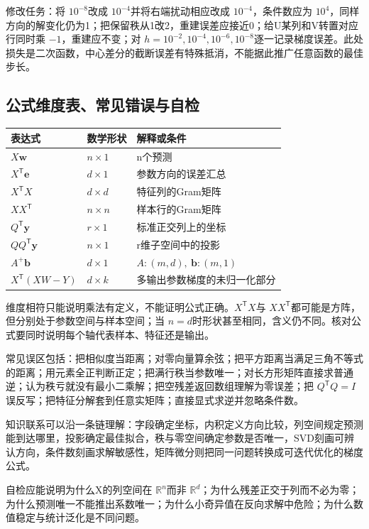 \documentclass[UTF8,fontset=none,zihao=-4,a4paper]{ctexart}
\numberwithin{equation}{section}
\numberwithin{figure}{section}
\begin{document}
修改任务：将 $10^{-8}$改成 $10^{-4}$并将右端扰动相应改成 $10^{-4}$，条件数应为 $10^4$，同样方向的解变化仍为1；把保留秩从1改2，重建误差应接近0；给U某列和V转置对应行同时乘 $-1$，重建应不变；对 $h=10^{-2},10^{-4},10^{-6},10^{-8}$逐一记录梯度误差。此处损失是二次函数，中心差分的截断误差有特殊抵消，不能据此推广任意函数的最佳步长。

\subsection{公式维度表、常见错误与自检}
\begin{center}
\begin{tabularx}{\linewidth}{l l Y}
\toprule
表达式 & 数学形状 & 解释或条件\\\midrule
$X\symbf w$ & $n\times1$ & n个预测\\
$X^{\mathsf T}\symbf e$ & $d\times1$ & 参数方向的误差汇总\\
$X^{\mathsf T}X$ & $d\times d$ & 特征列的Gram矩阵\\
$XX^{\mathsf T}$ & $n\times n$ & 样本行的Gram矩阵\\
$Q^{\mathsf T}\symbf y$ & $r\times1$ & 标准正交列上的坐标\\
$QQ^{\mathsf T}\symbf y$ & $n\times1$ & r维子空间中的投影\\
$A^+\symbf b$ & $d\times1$ & $A:(m,d),\ \symbf b:(m,1)$\\
$X^{\mathsf T}(XW-Y)$ & $d\times k$ & 多输出参数梯度的未归一化部分\\\bottomrule
\end{tabularx}
\end{center}
维度相符只能说明乘法有定义，不能证明公式正确。$X^{\mathsf T}X$与 $XX^{\mathsf T}$都可能是方阵，但分别处于参数空间与样本空间；当 $n=d$时形状甚至相同，含义仍不同。核对公式要同时说明每个轴代表样本、特征还是输出。

常见误区包括：把相似度当距离；对零向量算余弦；把平方距离当满足三角不等式的距离；用元素全正判断正定；把满行秩当参数唯一；对长方形矩阵直接求普通逆；认为秩亏就没有最小二乘解；把空残差返回数组理解为零误差；把 $Q^{\mathsf T}Q=I$误反写；把特征分解套到任意实矩阵；直接显式求逆并忽略条件数。

知识联系可以沿一条链理解：字段确定坐标，内积定义方向比较，列空间规定预测能到达哪里，投影确定最佳拟合，秩与零空间确定参数是否唯一，SVD刻画可辨认方向，条件数刻画求解敏感性，矩阵微分则把同一问题转换成可迭代优化的梯度公式。

自检应能说明为什么X的列空间在 $\mathbb R^n$而非 $\mathbb R^d$；为什么残差正交于列而不必为零；为什么预测唯一不能推出系数唯一；为什么小奇异值在反向求解中危险；为什么数值稳定与统计泛化是不同问题。
\end{document}
